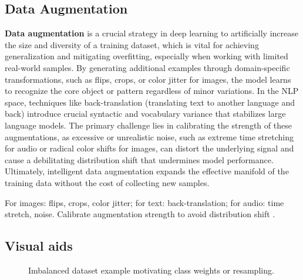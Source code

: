 
\subsection{Data Augmentation}

\textbf{Data augmentation} is a crucial strategy in deep learning to artificially increase the size and diversity of a training dataset, which is vital for achieving generalization and mitigating overfitting, especially when working with limited real-world samples. By generating additional examples through domain-specific transformations, such as flips, crops, or color jitter for images, the model learns to recognize the core object or pattern regardless of minor variations. In the NLP space, techniques like back-translation (translating text to another language and back) introduce crucial syntactic and vocabulary variance that stabilizes large language models. The primary challenge lies in calibrating the strength of these augmentations, as excessive or unrealistic noise, such as extreme time stretching for audio or radical color shifts for images, can distort the underlying signal and cause a debilitating distribution shift that undermines model performance. Ultimately, intelligent data augmentation expands the effective manifold of the training data without the cost of collecting new samples.

For images: flips, crops, color jitter; for text: back-translation; for audio: time stretch, noise. Calibrate augmentation strength to avoid distribution shift \textcite{Prince2023}.

\subsection{Visual aids}

\begin{figure}[ht]
  \centering
  \caption{Imbalanced dataset example motivating class weights or resampling.}
  \label{fig:imbalance-bar}
\end{figure}

